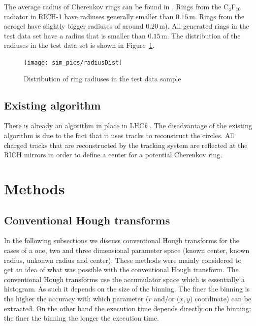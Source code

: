 \documentclass[11pt]{scrreprt}
\begin{document}
The average radius of Cherenkov rings can be found in \cite{Forty1999}. Rings from the C$_4$F$_{10}$ radiator in RICH-1 have radiuses generally smaller than $0.15$\,m. Rings from the aerogel have slightly bigger radiuses of around $0.20$\,m). All generated rings in the test data set have a radius that is smaller than $0.15$\,m. The distribution of the radiuses in the test data set is shown in Figure~\ref{fig:radius_dist}.

\begin{figure}[tb]
  \centering
  \texttt{[image: sim\_pics/radiusDist]}
  \caption{Distribution of ring radiuses in the test data sample}
  \label{fig:radius_dist}
\end{figure}

\section{Existing algorithm} %
\label{sub:existing_algorithm}
There is already an algorithm in place in LHC\textit{b} \cite{Forty1999}. The disadvantage of the existing algorithm is due to the 
fact that it uses tracks to reconstruct the circles. All charged tracks that are reconstructed by the tracking system are reflected at
the RICH mirrors in order to define a center for a potential Cherenkov ring.


\chapter{Methods}

\section{Conventional Hough transforms} %
\label{sec:conventional_hough_transforms}

In the following subsections we discuss  conventional Hough transforms for the cases of a one, two and three dimensional parameter space (known center, known radius, unkonwn radius and center). 
These methods were mainly considered to get an idea of what was possible with the conventional Hough transform.
The conventional Hough transforms use the accumulator space which is essentially a histogram. As such it depends on the size of the binning. The finer the binning is the higher the accuracy with which parameter ($r$ and/or ($x,y$) coordinate) can be extracted. On the other hand the execution time depends directly on the binning; the finer the binning the longer the execution time.
\end{document}
